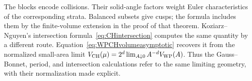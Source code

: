 The blocks encode collisions. Their solid-angle factors weight
Euler characteristics of the corresponding strata. Balanced subsets
give cusps; the formula includes them by the finite-volume extension
in the proof of that theorem. Koziarz--Nguyen's
intersection formula~\eqref{eq:CHintersection} computes the same
quantity by a different route. Equation~\eqref{eq:WPCHvolumeasymptotic}
recovers it from the normalized small-area limit
$V_{\mathrm{CH}}(\mu)=2^d\lim_{A\downarrow0}A^{-d}V_{\mathrm{WP}}(A)$. Thus the
Gauss--Bonnet, period, and intersection calculations refer to the
same limiting geometry, with their normalization made explicit.


